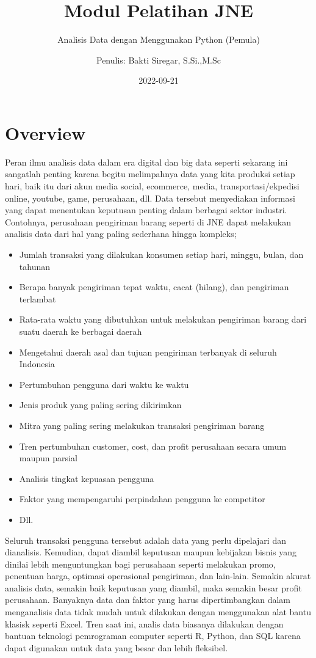 \documentclass[
]{docs}
\title{Modul Pelatihan JNE}
\subtitle{Analisis Data dengan Menggunakan Python (Pemula)}
\author{Penulis: Bakti Siregar, S.Si.,M.Sc}
\date{2022-09-21}
\providecommand{\tightlist}{%
  \setlength{\itemsep}{0pt}\setlength{\parskip}{0pt}}
\begin{document}
\maketitle

{
\setcounter{tocdepth}{2}
\tableofcontents
}
\hypertarget{overview}{%
\section*{Overview}\label{overview}}

Peran ilmu analisis data dalam era digital dan big data seperti sekarang ini sangatlah penting karena begitu melimpahnya data yang kita produksi setiap hari, baik itu dari akun media social, ecommerce, media, transportasi/ekpedisi online, youtube, game, perusahaan, dll. Data tersebut menyediakan informasi yang dapat menentukan keputusan penting dalam berbagai sektor industri. Contohnya, perusahaan pengiriman barang seperti di JNE dapat melakukan analisis data dari hal yang paling sederhana hingga kompleks;

\begin{itemize}
\tightlist
\item
  Jumlah transaksi yang dilakukan konsumen setiap hari, minggu, bulan, dan tahunan
\item
  Berapa banyak pengiriman tepat waktu, cacat (hilang), dan pengiriman terlambat
\item
  Rata-rata waktu yang dibutuhkan untuk melakukan pengiriman barang dari suatu daerah ke berbagai daerah
\item
  Mengetahui daerah asal dan tujuan pengiriman terbanyak di seluruh Indonesia
\item
  Pertumbuhan pengguna dari waktu ke waktu
\item
  Jenis produk yang paling sering dikirimkan
\item
  Mitra yang paling sering melakukan transaksi pengiriman barang
\item
  Tren pertumbuhan customer, cost, dan profit perusahaan secara umum maupun parsial
\item
  Analisis tingkat kepuasan pengguna
\item
  Faktor yang mempengaruhi perpindahan pengguna ke competitor
\item
  Dll.
\end{itemize}

Seluruh transaksi pengguna tersebut adalah data yang perlu dipelajari dan dianalisis. Kemudian, dapat diambil keputusan maupun kebijakan bisnis yang dinilai lebih menguntungkan bagi perusahaan seperti melakukan promo, penentuan harga, optimasi operasional pengiriman, dan lain-lain. Semakin akurat analisis data, semakin baik keputusan yang diambil, maka semakin besar profit perusahaan. Banyaknya data dan faktor yang harus dipertimbangkan dalam menganalisis data tidak mudah untuk dilakukan dengan menggunakan alat bantu klasisk seperti Excel. Tren saat ini, analis data biasanya dilakukan dengan bantuan teknologi pemrograman computer seperti R, Python, dan SQL karena dapat digunakan untuk data yang besar dan lebih fleksibel.
\end{document}
